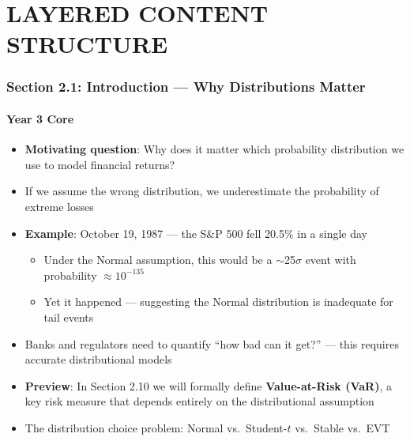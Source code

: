 \documentclass[11pt, a4paper]{article}
\theoremstyle{definition}
\begin{document}
\part{LAYERED CONTENT STRUCTURE}

\section{Section 2.1: Introduction — Why Distributions Matter}

\subsection{Year 3 Core}
\begin{itemize}
  \item \textbf{Motivating question}: Why does it matter which probability distribution we use to model financial returns?
  \item If we assume the wrong distribution, we underestimate the probability of extreme losses
  \item \textbf{Example}: October 19, 1987 — the S\&P 500 fell 20.5\% in a single day
  \begin{itemize}
    \item Under the Normal assumption, this would be a $\sim$25$\sigma$ event with probability $\approx 10^{-135}$
    \item Yet it happened — suggesting the Normal distribution is inadequate for tail events
  \end{itemize}
  \item Banks and regulators need to quantify ``how bad can it get?'' — this requires accurate distributional models
  \item \textbf{Preview}: In Section 2.10 we will formally define \textbf{Value-at-Risk (VaR)}, a key risk measure that depends entirely on the distributional assumption
  \item The distribution choice problem: Normal vs.\ Student-$t$ vs.\ Stable vs.\ EVT
\end{itemize}
\end{document}
